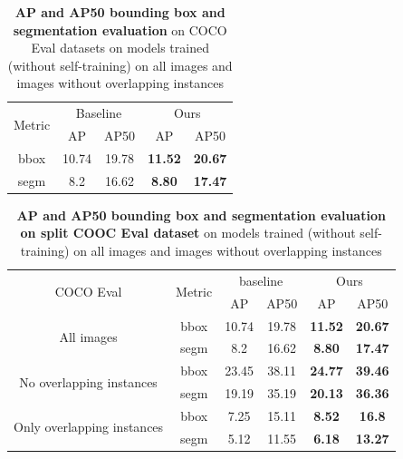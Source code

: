 \begin{table}[htbp]
	\centering
	\begin{tabular}{c|cc|cc}
		\toprule
		\multirow{2}{*}{Metric} & \multicolumn{2}{c|}{Baseline} & \multicolumn{2}{c}{Ours} \\ \cmidrule{2-5}
		& AP & AP50 & AP & AP50 \\ \midrule
		bbox & 10.74 & 19.78 & \textbf{11.52} & \textbf{20.67} \\
		\midrule
		segm & 8.2 & 16.62 & \textbf{8.80} & \textbf{17.47} \\
		\bottomrule
	\end{tabular}
	\caption[\textbf{Evaluation of Models Trained with and without Overlapping Instances }]{\textbf{AP and AP50 bounding box and segmentation evaluation} on COCO Eval datasets on models trained (without self-training) on all images and images without overlapping instances}
	\label{tab:overlap_analysis}
\end{table}

\begin{table}[htbp]
	\centering
	\begin{tabular}{c|c|cc|cc}
		\toprule
		\multirow{2}{*}{COCO Eval} & \multirow{2}{*}{Metric} & \multicolumn{2}{c|}{baseline} & \multicolumn{2}{c}{Ours} \\ \cmidrule{3-6}
		& & AP & AP50 & AP & AP50 \\ \midrule
		\multirow{2}{*}{All images} & bbox & 10.74 & 19.78 & \textbf{11.52} & \textbf{20.67} \\ 
		& segm & 8.2 & 16.62 & \textbf{8.80} & \textbf{17.47}  \\ \midrule
		\multirow{2}{*}{No overlapping instances} & bbox & 23.45 & 38.11 & \textbf{24.77} & \textbf{39.46} \\
		& segm & 19.19 & 35.19  & \textbf{20.13} & \textbf{36.36} \\
		\midrule
		\multirow{2}{*}{Only overlapping instances} & bbox & 7.25 & 15.11 & \textbf{8.52} & \textbf{16.8} \\ 
		& segm & 5.12 & 11.55 & \textbf{6.18} & \textbf{13.27} \\
		\bottomrule
	\end{tabular}
	\caption[\textbf{Evaluation of Models Trained with and without Overlapping Instances with Evaluation Dataset Split}]{\textbf{AP and AP50 bounding box and segmentation evaluation on split COOC Eval dataset} on models trained (without self-training) on all images and images without overlapping instances}
	\label{tab:combined_overlap_eval}
\end{table}

